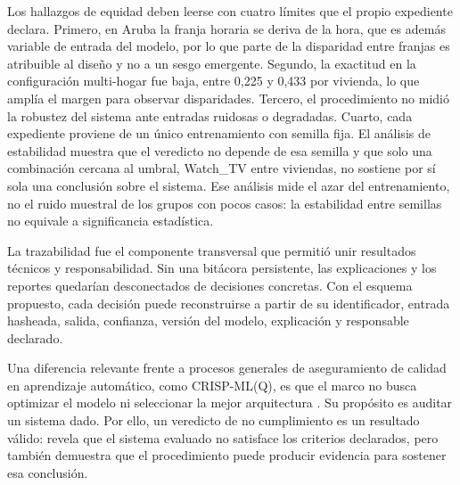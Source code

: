 Los hallazgos de equidad deben leerse con cuatro límites que el propio
expediente declara. Primero, en Aruba la franja horaria se deriva de la hora,
que es además variable de entrada del modelo, por lo que parte de la disparidad
entre franjas es atribuible al diseño y no a un sesgo emergente. Segundo, la
exactitud en la configuración multi-hogar fue baja, entre 0,225 y 0,433 por
vivienda, lo que amplía el margen para observar disparidades. Tercero, el
procedimiento no midió la robustez del sistema ante entradas ruidosas o
degradadas. Cuarto, cada expediente proviene de un único entrenamiento con
semilla fija. El análisis de estabilidad muestra que el veredicto no depende de
esa semilla y que solo una combinación cercana al umbral, Watch\_TV entre
viviendas, no sostiene por sí sola una conclusión sobre el sistema. Ese análisis
mide el azar del entrenamiento, no el ruido muestral de los grupos con pocos
casos: la estabilidad entre semillas no equivale a significancia estadística.

La trazabilidad fue el componente transversal que permitió unir resultados
técnicos y responsabilidad. Sin una bitácora persistente, las explicaciones y
los reportes quedarían desconectados de decisiones concretas. Con el esquema
propuesto, cada decisión puede reconstruirse a partir de su identificador,
entrada hasheada, salida, confianza, versión del modelo, explicación y
responsable declarado.

Una diferencia relevante frente a procesos generales de aseguramiento de calidad
en aprendizaje automático, como CRISP-ML(Q), es que el marco no busca optimizar
el modelo ni seleccionar la mejor arquitectura \cite{studer2021crispmlq}. Su
propósito es auditar un sistema dado. Por ello, un veredicto de no cumplimiento
es un resultado válido: revela que el sistema evaluado no satisface los
criterios declarados, pero también demuestra que el procedimiento puede
producir evidencia para sostener esa conclusión.

